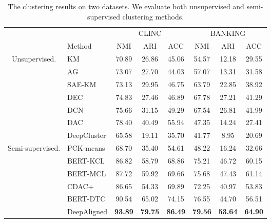 \documentclass[letterpaper]{article} \usepackage{aaai21}  \usepackage{times}  \usepackage{helvet} \usepackage{courier}  \usepackage[hyphens]{url}  \usepackage{graphicx} \urlstyle{rm} \def\UrlFont{\rm}  \usepackage{natbib}  \usepackage{caption} \frenchspacing  \setlength{\pdfpagewidth}{8.5in}  \setlength{\pdfpageheight}{11in}  \usepackage{amsmath}
\begin{document}
\begin{table*}[t!]\small
		\centering
		\begin{tabular}{@{\extracolsep{4pt}}clcccccc}
			\toprule
			\centering
			&  & \multicolumn{3}{c}{CLINC} & \multicolumn{3}{c}{BANKING}\\
			\addlinespace[0.1cm] \cline{3-5} \cline{6-8} \addlinespace[0.1cm]
			& Method & NMI  & ARI & ACC & NMI & ARI & ACC \\
			\midrule
			\multirow{7}{*}{Unsupervised.} 
			& KM  & 70.89 & 26.86 & 45.06 & 54.57 & 12.18 & 29.55 \\
			& AG  & 73.07 & 27.70 & 44.03 & 57.07 & 13.31 & 31.58 \\
			& SAE-KM & 73.13 & 29.95 & 46.75  & 63.79 & 22.85 & 38.92 \\
			& DEC  & 74.83 & 27.46 & 46.89 & 67.78 & 27.21 & 41.29 \\
			& DCN  & 75.66 & 31.15 & 49.29 & 67.54  & 26.81 & 41.99 \\
			& DAC  & 78.40 & 40.49 & 55.94 & 47.35 & 14.24 & 27.41 \\
			& DeepCluster & 65.58 & 19.11 & 35.70 & 41.77 & 8.95 & 20.69\\
			\midrule
			\multirow{6}{*}{Semi-supervised.} 
			& PCK-means  & 68.70 & 35.40 & 54.61 & 48.22 & 16.24 & 32.66\\
			& BERT-KCL  & 86.82 & 58.79 & 68.86 &  75.21 & 46.72 & 60.15 \\
			& BERT-MCL  & 87.72 & 59.92 & 69.66 & 75.68 & 47.43 & 61.14 \\
			& CDAC+  & 86.65 & 54.33 & 69.89	& 72.25	& 40.97	& 53.83 \\
			& BERT-DTC  & 90.54 & 65.02 & 74.15 & 76.55 & 44.70 & 56.51 \\
			& DeepAligned  & \textbf{93.89} & \textbf{79.75} & \textbf{86.49} & \textbf{79.56} & \textbf{53.64} & \textbf{64.90}\\
			\bottomrule
		\end{tabular}
		\caption{ \label{results-main}  
			The clustering results on two datasets. We evaluate both unsupervised and semi-supervised clustering methods.  
		}
	\end{table*}
\end{document}

